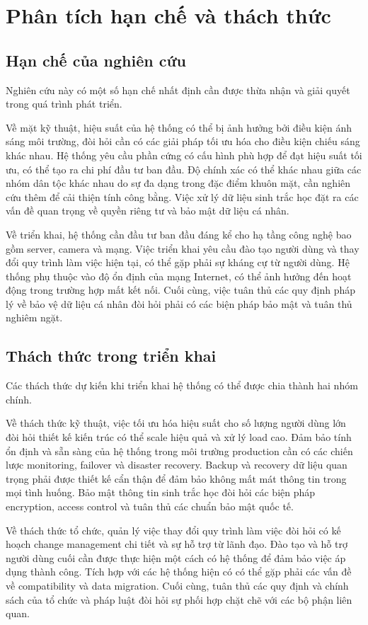 \documentclass[12pt,a4paper]{report}
\begin{document}
\section{Phân tích hạn chế và thách thức}
\subsection{Hạn chế của nghiên cứu}
Nghiên cứu này có một số hạn chế nhất định cần được thừa nhận và giải quyết trong quá trình phát triển.

Về mặt kỹ thuật, hiệu suất của hệ thống có thể bị ảnh hưởng bởi điều kiện ánh sáng môi trường, đòi hỏi cần có các giải pháp tối ưu hóa cho điều kiện chiếu sáng khác nhau. Hệ thống yêu cầu phần cứng có cấu hình phù hợp để đạt hiệu suất tối ưu, có thể tạo ra chi phí đầu tư ban đầu. Độ chính xác có thể khác nhau giữa các nhóm dân tộc khác nhau do sự đa dạng trong đặc điểm khuôn mặt, cần nghiên cứu thêm để cải thiện tính công bằng. Việc xử lý dữ liệu sinh trắc học đặt ra các vấn đề quan trọng về quyền riêng tư và bảo mật dữ liệu cá nhân.

Về triển khai, hệ thống cần đầu tư ban đầu đáng kể cho hạ tầng công nghệ bao gồm server, camera và mạng. Việc triển khai yêu cầu đào tạo người dùng và thay đổi quy trình làm việc hiện tại, có thể gặp phải sự kháng cự từ người dùng. Hệ thống phụ thuộc vào độ ổn định của mạng Internet, có thể ảnh hưởng đến hoạt động trong trường hợp mất kết nối. Cuối cùng, việc tuân thủ các quy định pháp lý về bảo vệ dữ liệu cá nhân đòi hỏi phải có các biện pháp bảo mật và tuân thủ nghiêm ngặt.

\subsection{Thách thức trong triển khai}
Các thách thức dự kiến khi triển khai hệ thống có thể được chia thành hai nhóm chính.

Về thách thức kỹ thuật, việc tối ưu hóa hiệu suất cho số lượng người dùng lớn đòi hỏi thiết kế kiến trúc có thể scale hiệu quả và xử lý load cao. Đảm bảo tính ổn định và sẵn sàng của hệ thống trong môi trường production cần có các chiến lược monitoring, failover và disaster recovery. Backup và recovery dữ liệu quan trọng phải được thiết kế cẩn thận để đảm bảo không mất mát thông tin trong mọi tình huống. Bảo mật thông tin sinh trắc học đòi hỏi các biện pháp encryption, access control và tuân thủ các chuẩn bảo mật quốc tế.

Về thách thức tổ chức, quản lý việc thay đổi quy trình làm việc đòi hỏi có kế hoạch change management chi tiết và sự hỗ trợ từ lãnh đạo. Đào tạo và hỗ trợ người dùng cuối cần được thực hiện một cách có hệ thống để đảm bảo việc áp dụng thành công. Tích hợp với các hệ thống hiện có có thể gặp phải các vấn đề về compatibility và data migration. Cuối cùng, tuân thủ các quy định và chính sách của tổ chức và pháp luật đòi hỏi sự phối hợp chặt chẽ với các bộ phận liên quan.
\end{document}
